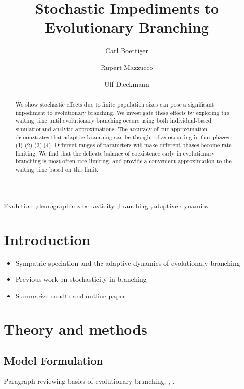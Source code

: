 \documentclass[authoryear,1p,10pt]{elsarticle}
\begin{document}
\begin{frontmatter}
\title{Stochastic Impediments to Evolutionary Branching}
\author[carl]{Carl Boettiger}
\author[rupert]{Rupert Mazzucco}
\author[ulf]{Ulf Dieckmann}
\address[carl]{Center for Population Biology, University of California, Davis, United States}
\address[rupert]{International Institute for Applied Systems Analysis, Austria}
\address[ulf]{International Institute for Applied Systems Analysis, Austria}
\begin{abstract}
We show stochastic effects due to finite population sizes can pose a significant impediment to evolutionary branching.   We investigate these effects by exploring the waiting time until evolutionary branching occurs using both individual-based simulationand analytic approximations.  The accuracy of our approximation demonstrates that adaptive branching can be thought of as occurring in four phases: (1) (2) (3) (4).  Different ranges of parameters will make different phases become rate-limiting.  We find that the delicate balance of coexistence early in evolutionary branching is most often rate-limiting, and provide a convenient approximation to the waiting time based on this limit.   
\end{abstract}
\begin{keyword}
Evolution \sep demographic stochasticity \sep branching \sep adaptive dynamics
\end{keyword}
\end{frontmatter}
\section{Introduction}
\begin{itemize}
\item Sympatric speciation and the adaptive dynamics of evolutionary branching
\item Previous work on stochasticity in branching \citet{Claessen2007a, Claessen2007, Claessen2008, Johansson2006}
\item Summarize results and outline paper 
\end{itemize}
\section{Theory and methods}
\subsection{Model Formulation}
Paragraph reviewing basics of evolutionary branching, \citet{Geritz1997}, \citet{Dieckmann1999a}.
\end{document}
